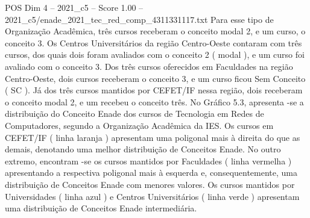\begin{textsample}{POS Dim 4 – 2021\_c5 – Score 1.00 – 2021\_c5/enade\_2021\_tec\_red\_comp\_4311331117.txt}
Para esse tipo de Organização Acadêmica, três cursos receberam o conceito modal 2, e um curso, o conceito 3.
Os Centros Universitários da região Centro-Oeste contaram com três cursos, dos quais dois foram avaliados com o conceito 2 ( modal ), e um curso foi avaliado com o conceito 3.
Dos três cursos oferecidos em Faculdades na região Centro-Oeste, dois cursos receberam o conceito 3, e um curso ficou Sem Conceito ( SC ).
Já dos três cursos mantidos por CEFET/IF nessa região, dois receberam o conceito modal 2, e um recebeu o conceito três.
No Gráfico 5.3, apresenta -se a distribuição do Conceito Enade dos cursos de Tecnologia em Redes de Computadores, segundo a Organização Acadêmica da IES.
Os cursos em CEFET/IF ( linha laranja ) apresentam uma poligonal mais à direita do que as demais, denotando uma melhor distribuição de Conceitos Enade.
No outro extremo, encontram -se os cursos mantidos por Faculdades ( linha vermelha ) apresentando a respectiva poligonal mais à esquerda e, consequentemente, uma distribuição de Conceitos Enade com menores valores.
Os cursos mantidos por Universidades ( linha azul ) e Centros Universitários ( linha verde ) apresentam uma distribuição de Conceitos Enade intermediária.

\end{textsample}
